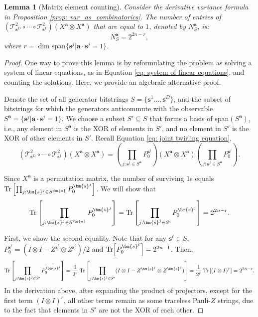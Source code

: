 \documentclass[a4paper,onecolumn,notitlepage,nofootinbib,longbibliography,superscriptaddress, floatfix, pra, aps, 10pt]{revtex4-2}
\newcommand{\vta}{{\bm{a}}}
\newcommand{\vtsj}{{\bm{s}^j}}
\newcommand{\vtsl}{{\bm{s}^\ell}}
\newcommand{\vts}{{\bm{s}}}
\newtheorem{lemma}{Lemma}
\begin{document}
\begin{lemma}[Matrix element counting] \label{lem: matrix element counting}
Consider the derivative variance formula in Proposition \ref{prop: var_as_combinatorics}. The number of entries of $\left(\mathcal{T}^2_{\vts^D}\circ\cdots\circ\mathcal{T}^2_{\vts^1}\right)(X^\vta \otimes X^\vta)$ that are equal to $1$, denoted by $N_S^\vta$, is:
\begin{equation}
N_S^\vta = 2^{2n-r},
\end{equation}
where $r = \dim \text{span} \{\vts^j|\vta \cdot \vts^j = 1\}$.
\end{lemma}
\begin{proof}
One way to prove this lemma is by reformulating the problem as solving a system of linear equations, as in Equation \ref{eq: system of linear equations}, and counting the solutions. Here, we provide an algebraic alternative proof. 

Denote the set of all generator bitstrings $S=\{\vts^1 \dots, \vts^D\}$, and the subset of bitstrings for which the generators anticommute with the observable $S^\vta=\{\vts^j|\vta \cdot \vts^j = 1\}$. We choose a subset $S'\subseteq S$ that forms a basis of $\text{span}(S^\vta)$, i.e., any element in $S^\vta$ is the XOR of elements in $S'$, and no element in $S'$ is the XOR of other elements in $S'$. 
Recall Equation \ref{eq: joint twirling equation},
\begin{equation}
\left(\mathcal{T}^2_{\vts^D}\circ\cdots\circ\mathcal{T}^2_{\vts^1}\right)(X^\vta \otimes X^\vta) = \left(\prod_{j:\vtsj \in S^\vta} P_0^\vtsj\right) (X^\vta \otimes X^\vta)  \left(\prod_{j:\vtsj \in S^\vta} P_0^\vtsj\right).
\end{equation}

Since $X^\vta$ is a permutation matrix, the number of surviving $1$s equals $\Tr\left[\prod_{j:\vtsj \in S^\vta} P_0^\vtsj\right]$. We will show that 
\begin{equation}
\Tr\left[\prod_{j:\vtsj \in S^\vta} P_0^\vtsj\right] = \Tr\left[\prod_{j:\vtsj \in S'} P_0^\vtsj\right] = 2^{2n-r}.
\end{equation}

First, we show the second equality. Note that for any $\vtsl \in S$, $P_0^\vtsl = (I\otimes I - Z^\vtsl\otimes Z^\vtsl)/2$ and $\Tr[P_0^\vtsl] = 2^{2n-1}$. Then, \begin{equation}\Tr\left[\prod_{j:\vtsj \in S'} P_0^\vtsj\right] = \frac{1}{2^r}\Tr\left[\prod_{j:\vtsj \in S'}(I\otimes I - Z^{\vtsj}\otimes Z^{\vtsj})\right] = \frac{1}{2^r}\Tr\left[(I\otimes I)^r \right] = 
2^{2n-r}.\end{equation} In the derivation above, after expanding the product of projectors, except for the first term $(I\otimes I)^{r}$, all other terms remain as some traceless Pauli-$Z$ strings, due to the fact that elements in $S'$ are not the XOR of each other. 


\end{proof}
\end{document}

